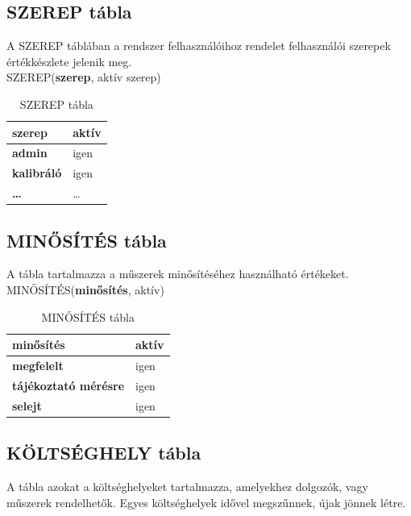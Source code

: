 \documentclass[a4paper,12pt]{report}
\newcommand{\pk}[1]{\textbf{#1}} %
\newcommand{\tabla}[1]{\noindent\MakeUppercase{#1}} %
\begin{document}
\subsection{SZEREP tábla}
A \tabla{szerep} táblában a rendszer felhasználóihoz rendelet felhasználói 
szerepek értékkészlete jelenik meg.\\

\tabla{SZEREP}(\pk{szerep}, aktív szerep)

\begin{table}[ht!]
\centering
{\footnotesize \begin{tabular}[t]{|l|l|}
\hline
 \textbf{szerep}&aktív\\\hline
 \textbf{admin}&igen\\
 \textbf{kalibráló}&igen\\
 \textbf{\dots}&\dots\\
\end{tabular}}
\caption{SZEREP tábla} \label{tabSZEREP}
\end{table}


\subsection{MINŐSÍTÉS tábla}
A tábla tartalmazza a műszerek minősítéséhez használható értékeket.\\

\tabla{MINŐSÍTÉS}(\pk{minősítés}, aktív)
\begin{table}[ht!]
\centering
\begin{footnotesize}
\begin{tabular}[t]{|l|l|}
\hline
 \textbf{minősítés}&aktív\\\hline
 \textbf{megfelelt}&igen\\
 \textbf{tájékoztató mérésre}&igen\\
 \textbf{selejt}&igen\\
 \hline
\end{tabular}
\end{footnotesize}
\caption{MINŐSÍTÉS tábla} \label{tabMINOSITES}
\end{table}


\subsection{KÖLTSÉGHELY tábla}
A tábla azokat a költséghelyeket tartalmazza, amelyekhez dolgozók, vagy 
műszerek rendelhetők. Egyes költséghelyek idővel megszűnnek, újak jönnek
létre.\\
\end{document}
